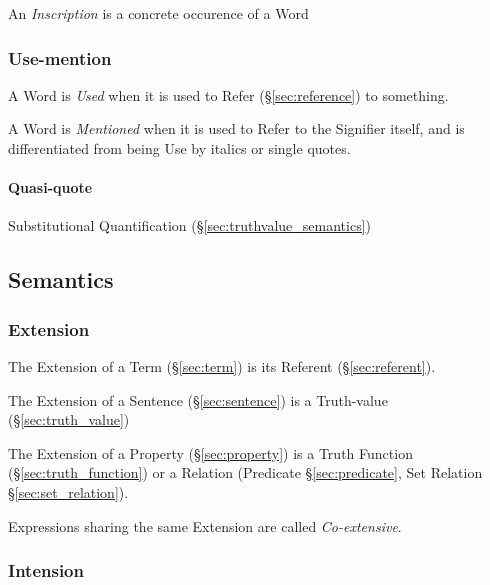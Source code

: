An \emph{Inscription} is a concrete occurence of a Word



\subsubsection{Use-mention}\label{sec:use_mention}

A Word is \emph{Used} when it is used to Refer (\S\ref{sec:reference})
to something.

A Word is \emph{Mentioned} when it is used to Refer to the Signifier
itself, and is differentiated from being Use by italics or single
quotes.



\paragraph{Quasi-quote}\label{sec:quasi_quote}\hfill

Substitutional Quantification (\S\ref{sec:truthvalue_semantics})



\subsection{Semantics}\label{sec:semantics}

\subsubsection{Extension}\label{sec:extension}\cite{chalmers02}

The Extension of a Term (\S\ref{sec:term}) is its Referent
(\S\ref{sec:referent}).

The Extension of a Sentence (\S\ref{sec:sentence}) is a Truth-value
(\S\ref{sec:truth_value})

The Extension of a Property (\S\ref{sec:property}) is a Truth Function
(\S\ref{sec:truth_function}) or a Relation (Predicate
\S\ref{sec:predicate}, Set Relation \S\ref{sec:set_relation}).

Expressions sharing the same Extension are called \emph{Co-extensive}.



\subsubsection{Intension}\label{sec:intension}\cite{chalmers02}

